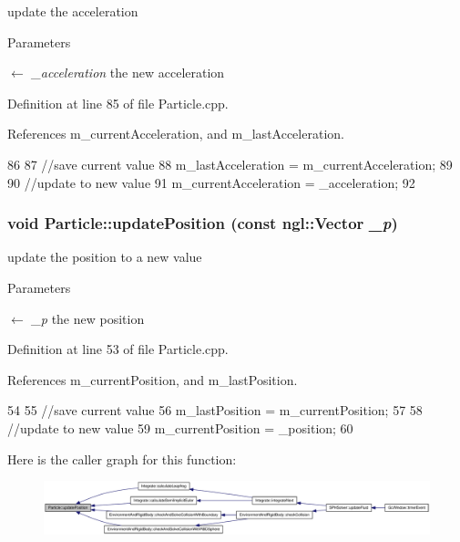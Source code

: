 update the acceleration 


\begin{DoxyParams}{Parameters}
\item[\mbox{$\leftarrow$} {\em \_\-acceleration}]the new acceleration \end{DoxyParams}


Definition at line 85 of file Particle.cpp.



References m\_\-currentAcceleration, and m\_\-lastAcceleration.




\begin{DoxyCode}
86 {
87     //save current value
88     m_lastAcceleration = m_currentAcceleration;
89 
90     //update to new value
91     m_currentAcceleration = _acceleration;
92 }
\end{DoxyCode}


\hypertarget{class_particle_a4ea44dad91df2b0374f2d40d44452b76}{
\subsubsection[{updatePosition}]{\setlength{\rightskip}{0pt plus 5cm}void Particle::updatePosition (const ngl::Vector {\em \_\-p})}}
\label{class_particle_a4ea44dad91df2b0374f2d40d44452b76}


update the position to a new value 


\begin{DoxyParams}{Parameters}
\item[\mbox{$\leftarrow$} {\em \_\-p}]the new position \end{DoxyParams}


Definition at line 53 of file Particle.cpp.



References m\_\-currentPosition, and m\_\-lastPosition.




\begin{DoxyCode}
54 {
55     //save current value
56     m_lastPosition = m_currentPosition;
57 
58     //update to new value
59     m_currentPosition = _position;
60 }
\end{DoxyCode}




Here is the caller graph for this function:\nopagebreak
\begin{figure}[H]
\begin{center}
\leavevmode
\includegraphics[width=420pt]{class_particle_a4ea44dad91df2b0374f2d40d44452b76_icgraph}
\end{center}
\end{figure}


